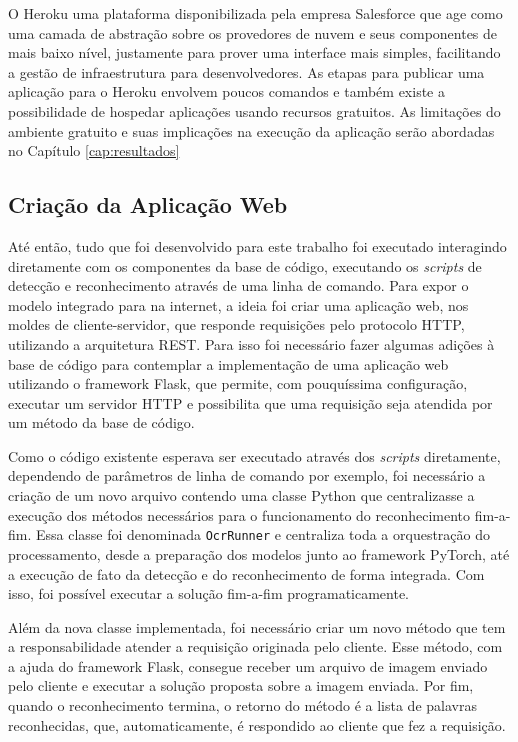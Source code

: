 O Heroku uma plataforma disponibilizada pela empresa Salesforce que age como uma camada de abstração sobre os provedores de nuvem e seus componentes de mais baixo nível, justamente para prover uma interface mais simples, facilitando a gestão de infraestrutura para desenvolvedores. As etapas para publicar uma aplicação para o Heroku envolvem poucos comandos e também existe a possibilidade de hospedar aplicações usando recursos gratuitos. As limitações do ambiente gratuito e suas implicações na execução da aplicação serão abordadas no Capítulo \ref{cap:resultados}

\subsection{Criação da Aplicação Web}\label{sec:methodology_web_app}
Até então, tudo que foi desenvolvido para este trabalho foi executado interagindo diretamente com os componentes da base de código, executando os \textit{scripts} de detecção e reconhecimento através de uma linha de comando. Para expor o modelo integrado para na internet, a ideia foi criar uma aplicação web, nos moldes de cliente-servidor, que responde requisições pelo protocolo HTTP, utilizando a arquitetura REST. Para isso foi necessário fazer algumas adições à base de código para contemplar a implementação de uma aplicação web utilizando o framework Flask, que permite, com pouquíssima configuração, executar um servidor HTTP e possibilita que uma requisição seja atendida por um método da base de código.

Como o código existente esperava ser executado através dos \textit{scripts} diretamente, dependendo de parâmetros de linha de comando por exemplo, foi necessário a criação de um novo arquivo contendo uma classe Python que centralizasse a execução dos métodos necessários para o funcionamento do reconhecimento fim-a-fim. Essa classe foi denominada \texttt{OcrRunner} e centraliza toda a orquestração do processamento, desde a preparação dos modelos junto ao framework PyTorch, até a execução de fato da detecção e do reconhecimento de forma integrada. Com isso, foi possível executar a solução fim-a-fim programaticamente.

Além da nova classe implementada, foi necessário criar um novo método que tem a responsabilidade atender a requisição originada pelo cliente. Esse método, com a ajuda do framework Flask, consegue receber um arquivo de imagem enviado pelo cliente e executar a solução proposta sobre a imagem enviada. Por fim, quando o reconhecimento termina, o retorno do método é a lista de palavras reconhecidas, que, automaticamente, é respondido ao cliente que fez a requisição.

